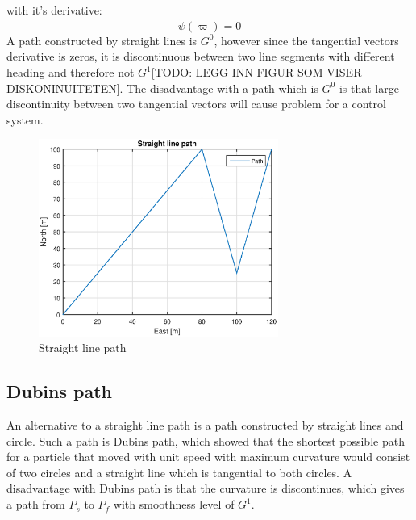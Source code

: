 with it's derivative:
\begin{equation}
\dot{\psi}(\varpi) = 0
\end{equation}
A path constructed by straight lines is $G^0$, however since the tangential vectors derivative is zeros, it is discontinuous between two line segments with different heading and therefore not $G^1$[TODO: LEGG INN FIGUR SOM VISER DISKONINUITETEN]. The disadvantage with a path which is $G^0$ is that large discontinuity between two tangential vectors will cause problem for a control system. 
\begin{figure}[H]
\includegraphics[width=0.7\textwidth]{figs/TheoryPlot/StraightLine.eps}
\caption{Straight line path}
\end{figure}
\subsection{Dubins path}\label{S:DubinsPath}
An alternative to a straight line path is a path constructed by straight lines and circle. Such a path is Dubins path\citep{dubins1957curves}, which showed that the shortest possible path for a particle that moved with unit speed with maximum curvature would consist of two circles and a straight line which is tangential to both circles. A disadvantage with Dubins path is that the curvature is discontinues, which gives a path from $P_s$ to $P_f$ with smoothness level of $G^1$.

